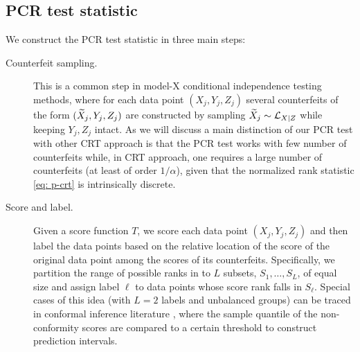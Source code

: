 \documentclass[11pt]{article}
\begin{document}
 
 
 
\subsection{PCR test statistic}
We construct the PCR test statistic in three main steps: 
\begin{description}
\item[Counterfeit sampling.] This is a common step in model-X conditional independence testing methods, where for each data point $(X_j,Y_j, Z_j)$ several counterfeits of the form $({\widetilde{X}}_j,Y_j,Z_j)$ are constructed by sampling ${\widetilde{X}}_j\sim \mathcal{L}_{X|Z}$ while keeping $Y_j, Z_j$ intact.  As we will discuss a main distinction of our PCR test with other CRT approach is that the PCR test works with few number of counterfeits while, in CRT approach, one requires a large number of counterfeits (at least of order $1/\alpha$), given that the normalized rank statistic \eqref{eq: p-crt} is intrinsically discrete.   
%

\item[ Score and label.] Given a score function $T$, we score each data point $(X_j,Y_j,Z_j)$ and then label the data points based on the relative location of the score of the original data point among the scores of its counterfeits. Specifically, we partition the range of possible ranks in to $L$ subsets, $S_1, \dotsc, S_L$, of equal size and assign label $\ell$ to data points whose score rank falls in $S_{\ell}$.  
Special cases of this idea (with $L=2$ labels and unbalanced groups) can be traced in conformal inference literature \cite{vovk2005algorithmic, lei2018distribution, lei2014distribution, romano2019conformalized}, where the sample quantile of the non-conformity scores are compared to a certain threshold to construct prediction intervals.
 

\end{description}
\end{document}
